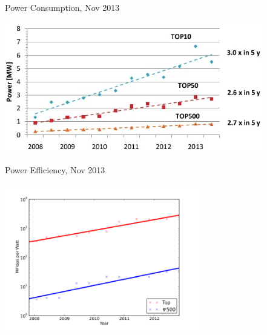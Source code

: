 \documentclass[xcolor=x11names,compress]{beamer}
\renewcommand{\(}{\begin{columns}}
\renewcommand{\)}{\end{columns}}
\newcommand{\<}[1]{\begin{column}{#1}}
\renewcommand{\>}{\end{column}}
\begin{document}
\begin{frame}{Power Consumption, Nov 2013}

\begin{center}
\includegraphics[height=2.25in]{Top500-power}
\end{center}

\end{frame}

\begin{frame}{Power Efficiency, Nov 2013}

\begin{center}
\includegraphics[height=2.5in]{Green500evolution}
\end{center}

\end{frame}
\end{document}
